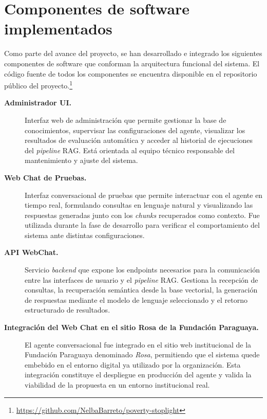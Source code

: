 \documentclass{article}
\begin{document}
\section{Componentes de software implementados}\label{sec:software}

Como parte del avance del proyecto, se han desarrollado e integrado los siguientes componentes de software que conforman la arquitectura funcional del sistema. El código fuente de todos los componentes se encuentra disponible en el repositorio público del proyecto.\footnote{\url{https://github.com/NelbaBarreto/poverty-stoplight}}

\begin{description}

  \item[\textbf{Administrador UI.}]
  Interfaz web de administración que permite gestionar la base de conocimientos, supervisar las configuraciones del agente, visualizar los resultados de evaluación automática y acceder al historial de ejecuciones del \textit{pipeline} RAG. Está orientada al equipo técnico responsable del mantenimiento y ajuste del sistema.

  \item[\textbf{Web Chat de Pruebas.}]
  Interfaz conversacional de pruebas que permite interactuar con el agente en tiempo real, formulando consultas en lenguaje natural y visualizando las respuestas generadas junto con los \textit{chunks} recuperados como contexto. Fue utilizada durante la fase de desarrollo para verificar el comportamiento del sistema ante distintas configuraciones.

  \item[\textbf{API WebChat.}]
  Servicio \textit{backend} que expone los endpoints necesarios para la comunicación entre las interfaces de usuario y el \textit{pipeline} RAG. Gestiona la recepción de consultas, la recuperación semántica desde la base vectorial, la generación de respuestas mediante el modelo de lenguaje seleccionado y el retorno estructurado de resultados.

  \item[\textbf{Integración del Web Chat en el sitio Rosa de la Fundación Paraguaya.}]
  El agente conversacional fue integrado en el sitio web institucional de la Fundación Paraguaya denominado \textit{Rosa}, permitiendo que el sistema quede embebido en el entorno digital ya utilizado por la organización. Esta integración constituye el despliegue en producción del agente y valida la viabilidad de la propuesta en un entorno institucional real.

\end{description}
\end{document}
